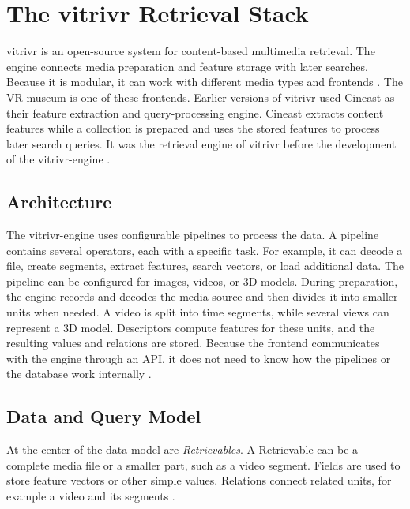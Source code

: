 \section{The vitrivr Retrieval Stack}
\label{sec:background-vitrivr}

vitrivr is an open-source system for content-based multimedia retrieval. The engine connects media preparation and feature storage with later searches. Because it is modular, it can work with different media types and frontends \citep{gasser2024engine}. The VR museum is one of these frontends. Earlier versions of vitrivr used Cineast as their feature extraction and query-processing engine. Cineast extracts content features while a collection is prepared and uses the stored features to process later search queries. It was the retrieval engine of vitrivr before the development of the vitrivr-engine \citep{rossetto2016vitrivr,gasser2024engine}.

\subsection{Architecture}
\label{subsec:background-vitrivr-architecture}

The vitrivr-engine uses configurable pipelines to process the data. A pipeline contains several operators, each with a specific task. For example, it can decode a file, create segments, extract features, search vectors, or load additional data. The pipeline can be configured for images, videos, or 3D models. During preparation, the engine records and decodes the media source and then divides it into smaller units when needed. A video is split into time segments, while several views can represent a 3D model. Descriptors compute features for these units, and the resulting values and relations are stored. Because the frontend communicates with the engine through an API, it does not need to know how the pipelines or the database work internally \citep{gasser2024engine}.

\subsection{Data and Query Model}
\label{subsec:background-vitrivr-model}

At the center of the data model are \emph{Retrievables}. A Retrievable can be a complete media file or a smaller part, such as a video segment. Fields are used to store feature vectors or other simple values. Relations connect related units, for example a video and its segments \citep{gasser2024engine}.

